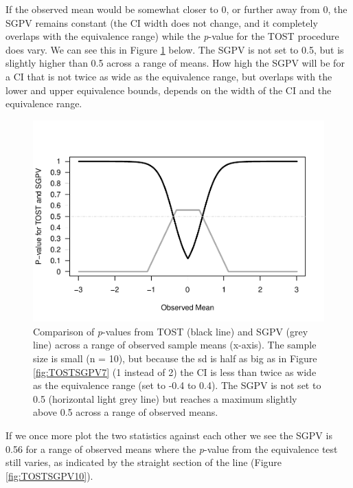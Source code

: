 \documentclass[,man,floatsintext]{apa6}
\begin{document}
If the observed mean would be somewhat closer to 0, or further away from
0, the SGPV remains constant (the CI width does not change, and it
completely overlaps with the equivalence range) while the \emph{p}-value
for the TOST procedure does vary. We can see this in Figure
\ref{fig:TOSTSGPV9} below. The SGPV is not set to 0.5, but is slightly
higher than 0.5 across a range of means. How high the SGPV will be for a
CI that is not twice as wide as the equivalence range, but overlaps with
the lower and upper equivalence bounds, depends on the width of the CI
and the equivalence range.

\begin{figure}
\centering
\includegraphics{manuscript.R1_files/figure-latex/TOSTSGPV9-1.pdf}
\caption{\label{fig:TOSTSGPV9}Comparison of \emph{p}-values from TOST (black
line) and SGPV (grey line) across a range of observed sample means
(x-axis). The sample size is small (n = 10), but because the sd is half
as big as in Figure \ref{fig:TOSTSGPV7} (1 instead of 2) the CI is less
than twice as wide as the equivalence range (set to -0.4 to 0.4). The
SGPV is not set to 0.5 (horizontal light grey line) but reaches a
maximum slightly above 0.5 across a range of observed means.}
\end{figure}

If we once more plot the two statistics against each other we see the
SGPV is 0.56 for a range of observed means where the \emph{p}-value from
the equivalence test still varies, as indicated by the straight section
of the line (Figure \ref{fig:TOSTSGPV10}).
\end{document}
